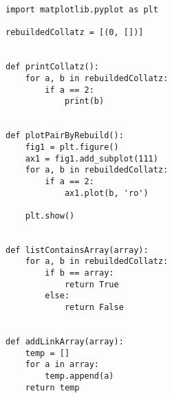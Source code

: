 \documentclass{article}
\begin{document}
\begin{verbatim}
import matplotlib.pyplot as plt

rebuildedCollatz = [(0, [])]


def printCollatz():
    for a, b in rebuildedCollatz:
        if a == 2:
            print(b)


def plotPairByRebuild():
    fig1 = plt.figure()
    ax1 = fig1.add_subplot(111)
    for a, b in rebuildedCollatz:
        if a == 2:
            ax1.plot(b, 'ro')

    plt.show()


def listContainsArray(array):
    for a, b in rebuildedCollatz:
        if b == array:
            return True
        else:
            return False


def addLinkArray(array):
    temp = []
    for a in array:
        temp.append(a)
    return temp
\end{verbatim}

\newpage
\end{document}
